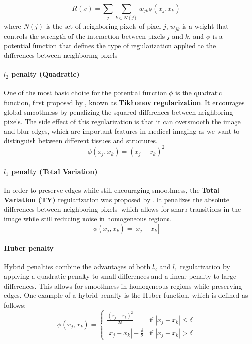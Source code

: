 \begin{equation}
    R(x) = \sum_{j} \sum_{k \in N(j)} w_{jk} \phi(x_j, x_k)
    \label{eq:mrf}
\end{equation}
where $N(j)$ is the set of neighboring pixels of pixel $j$, $w_{jk}$ is a weight that controls the strength of the interaction between pixels $j$ and $k$, and $\phi$ is a potential function that defines the type of regularization applied to the differences between neighboring pixels.

\paragraph{$l_2$ penalty (Quadratic)}

One of the most basic choice for the potential function $\phi$ is the quadratic function, first proposed by \cite{tikhonov1977solutions}, known as \textbf{Tikhonov regularization}. It encourages global smoothness by penalizing the squared differences between neighboring pixels. The side effect of this regularization is that it can oversmooth the image and blur edges, which are important features in medical imaging as we want to distinguish between different tissues and structures.
\begin{equation}
    \phi(x_j, x_k) = (x_j - x_k)^2
\end{equation}

\paragraph{$l_1$ penalty (Total Variation)}

In order to preserve edges while still encouraging smoothness, the \textbf{Total Variation (TV)} regularization was proposed by \cite{Rudin1992}. It penalizes the absolute differences between neighboring pixels, which allows for sharp transitions in the image while still reducing noise in homogeneous regions.
\begin{equation}
    \phi(x_j, x_k) = |x_j - x_k|
\end{equation}

\paragraph{Huber penalty}

Hybrid penalties combine the advantages of both $l_2$ and $l_1$ regularization by applying a quadratic penalty to small differences and a linear penalty to large differences. This allows for smoothness in homogeneous regions while preserving edges. One example of a hybrid penalty is the Huber function, which is defined as follows:
\begin{equation}
    \phi(x_j, x_k) = \begin{cases}
        \displaystyle \frac{(x_j - x_k)^2}{2 \delta}  & \text{if } |x_j - x_k| \leq \delta \\
        \displaystyle |x_j - x_k| - \frac{\delta}{2} & \text{if } |x_j - x_k| > \delta
    \end{cases}
\end{equation}



